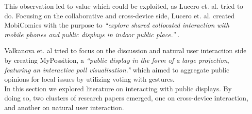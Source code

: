 This observation led to value which could be exploited, as Lucero et. al. tried to do. 
Focusing on the collaborative and cross-device side, Lucero et. al. created MobiComics with the purpose to \emph{``explore shared collocated interaction with mobile phones and public displays in indoor public place.''} \cite{Lucero:2012}. 

Valkanova et. al tried to focus on the discussion and natural user interaction side by creating MyPossition, a \emph{``public display in the form of a large projection, featuring an interactive poll visualisation.''} \cite{Valkanova:2014} which aimed to aggregate public opinions for local issues by utilizing voting with gestures.\\

In this section we explored literature on interacting with public displays. 
By doing so, two clusters of research papers emerged, one on cross-device interaction, and another on natural user interaction.
